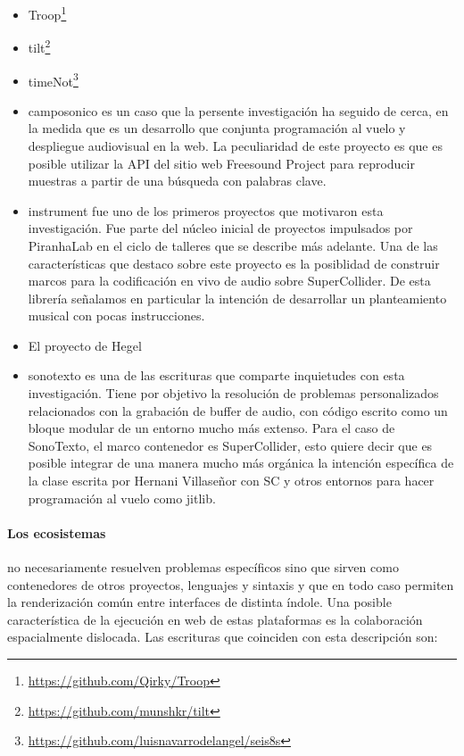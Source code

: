 \begin{itemize}
  
\item Troop\footnote{\url{https://github.com/Qirky/Troop}}
\item tilt\footnote{\url{https://github.com/munshkr/tilt}}
\item timeNot\footnote{\url{https://github.com/luisnavarrodelangel/seis8s}}
\item \Gls{camposonico} es un caso que la persente investigación ha seguido de cerca, en la medida que es un desarrollo que conjunta programación al vuelo y despliegue audiovisual en la web. La peculiaridad de este proyecto es que es posible utilizar la API del sitio web Freesound Project para reproducir muestras a partir de una búsqueda con palabras clave. 
\item \Gls{instrument} fue uno de los primeros proyectos que motivaron esta investigación. Fue parte del núcleo inicial de proyectos impulsados por PiranhaLab en el ciclo de talleres que se describe más adelante. Una de las características que destaco sobre este proyecto es la posiblidad de construir marcos para la codificación en vivo de audio sobre SuperCollider. De esta librería señalamos en particular la intención de desarrollar un planteamiento musical con pocas instrucciones. 
\item El proyecto de Hegel
\item \Gls{sonotexto} es una de las escrituras que comparte inquietudes con esta investigación. Tiene por objetivo la resolución de problemas personalizados relacionados con la grabación de buffer de audio, con código escrito como un bloque modular de un entorno mucho más extenso\citep{phdVillasenor}. Para el caso de SonoTexto, el marco contenedor es SuperCollider, esto quiere decir que es posible integrar de una manera mucho más orgánica la intención específica de la clase escrita por Hernani Villaseñor con SC y otros entornos para hacer programación al vuelo como \Gls{jitlib}.  
\end{itemize}


\paragraph{Los ecosistemas} no necesariamente resuelven problemas específicos sino que sirven como contenedores de otros proyectos, lenguajes y sintaxis y que en todo caso permiten la renderización común entre interfaces de distinta índole. Una posible característica de la ejecución en web de estas plataformas es la colaboración espacialmente dislocada. Las escrituras que coinciden con esta descripción son:

